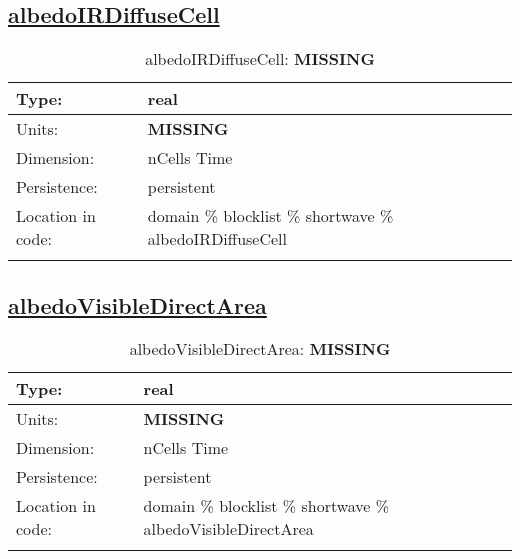 \subsection[albedoIRDiffuseCell]{\hyperref[sec:var_tab_shortwave]{albedoIRDiffuseCell}}
\label{subsec:var_sec_shortwave_albedoIRDiffuseCell}
\begin{center}
\begin{longtable}{| p{2.0in} | p{4.0in} |}
        \hline 
        Type: & real \\
        \hline 
        Units: & {\bf \color{red} MISSING} \\
        \hline 
        Dimension: & nCells Time \\
        \hline 
        Persistence: & persistent \\
        \hline 
         Location in code: & domain \% blocklist \% shortwave \% albedoIRDiffuseCell \\
         \hline 
    \caption{albedoIRDiffuseCell: {\bf \color{red} MISSING}}
\end{longtable}
\end{center}
\subsection[albedoVisibleDirectArea]{\hyperref[sec:var_tab_shortwave]{albedoVisibleDirectArea}}
\label{subsec:var_sec_shortwave_albedoVisibleDirectArea}
\begin{center}
\begin{longtable}{| p{2.0in} | p{4.0in} |}
        \hline 
        Type: & real \\
        \hline 
        Units: & {\bf \color{red} MISSING} \\
        \hline 
        Dimension: & nCells Time \\
        \hline 
        Persistence: & persistent \\
        \hline 
         Location in code: & domain \% blocklist \% shortwave \% albedoVisibleDirectArea \\
         \hline 
    \caption{albedoVisibleDirectArea: {\bf \color{red} MISSING}}
\end{longtable}
\end{center}
